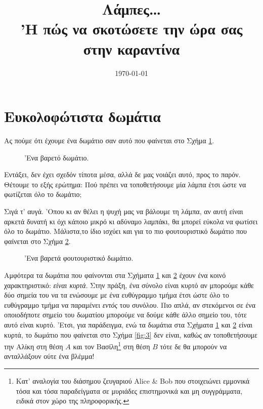 \documentclass[11pt,a4paper]{article}
\title{\Huge{\bf Λάμπες\ldots}\\{\Large'Η πώς να σκοτώσετε την ώρα σας στην καραντίνα}}
\date{\today}
\theoremstyle{definition}
\begin{document}
	\maketitle
	\section{Ευκολοφώτιστα δωμάτια}
	Ας πούμε ότι έχουμε ένα δωμάτιο σαν αυτό που φαίνεται στο Σχήμα \ref{fig:1}.
	
	\begin{figure}[!htb]
		\centering
		\caption{'Ενα βαρετό δωμάτιο.}
		\label{fig:1}
	\end{figure}

	Εντάξει, δεν έχει σχεδόν τίποτα μέσα, αλλά δε μας νοιάζει αυτό, προς το παρόν. Θέτουμε το εξής ερώτημα: Πού πρέπει να τοποθετήσουμε μία λάμπα έτσι ώστε να φωτίζεται όλο το δωμάτιο;
	
	Σιγά τ' αυγά. 'Οπου κι αν θέλει η ψυχή μας να βάλουμε τη λάμπα, αν αυτή είναι αρκετά δυνατή κι όχι κάποιο μικρό κι αδύναμο λαμπάκι, θα μπορεί εύκολα να φωτίσει όλο το δωμάτιο. Μάλιστα,το ίδιο ισχύει και για το πιο φουτουριστικό δωμάτιο που φαίνεται στο Σχήμα \ref{fig:2}.
	
	\begin{figure}[!htb]
		\centering
		\caption{'Ενα βαρετά φουτουριστικό δωμάτιο.}
		\label{fig:2}
	\end{figure}

	Αμφότερα τα δωμάτια που φαίνονται στα Σχήματα \ref{fig:1} και \ref{fig:2} έχουν ένα κοινό χαρακτηριστικό: \textit{είναι κυρτά}. Στην πράξη, ένα σύνολο είναι κυρτό αν μπορούμε κάθε δύο σημεία του να τα ενώσουμε με ένα ευθύγραμμο τμήμα έτσι ώστε όλο το ευθύγραμμο τμήμα να παραμένει \textit{εντός} του συνόλου. Πιο απλά, αν στεκόμενοι σε ένα οποιοδήποτε σημείο του δωματίου μπορούμε να δούμε κάθε άλλο σημείο του, τότε αυτό είναι κυρτό. 'Ετσι, για παράδειγμα, ενώ τα δωμάτια στα Σχήματα \ref{fig:1} και \ref{fig:2} είναι κυρτά, το δωμάτιο που φαίνεται στο Σχήμα \ref{fig:3} δεν είναι, καθώς αν τοποθετήσουμε την Αλίκη στη θέση $A$ και τον Βασίλη\footnote{Κατ' αναλογία του διάσημου ζευγαριού Alice \& Bob που στοιχειώνει εμμονικά τόσα και τόσα παραδείγματα σε μυριάδες επιστημονικά και μη συγγράμματα, ειδικά στον χώρο της πληροφορικής.} στη θέση $B$ τότε δε θα μπορούν να ανταλλάξουν ούτε ένα βλέμμα!
	
\end{document}
